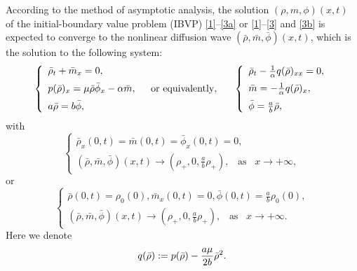 \documentclass[11pt]{article}
\theoremstyle{plain}
\numberwithin{equation}{section}
\begin{document}
According to the method of asymptotic analysis, the solution $\left(\rho,m,\phi\right)(x,t)$ of the initial-boundary value problem (IBVP) \eqref{1}--\eqref{3a} or \eqref{1}--\eqref{3} and \eqref{3b} is expected to converge to the nonlinear diffusion wave $\left(\bar\rho,\bar m,\bar\phi\right)(x,t)$, which is the solution to the following system:
	\begin{equation}\label{6}
		\left\{
		\begin{array}{lr}
			\bar\rho_t+\bar m_x=0,      \\[2mm]
			p(\bar\rho)_x=\mu\bar\rho\bar\phi_x-\alpha\bar m, \\[2mm]
			a\bar\rho=b\bar\phi,\\
		\end{array}
		\right.\;\;\;{\rm or \ equivalently,}\;\;\;\;\;\;
		\left\{
		\begin{array}{lr}
			\bar\rho_t-\frac{1}{\alpha}q(\bar\rho)_{xx}=0,     \\[2mm]
			\bar m=-\frac{1}{\alpha}q(\bar\rho)_x, \\[2mm]
			\bar\phi=\frac{a}{b}\bar\rho, \\
		\end{array}
		\right.
	\end{equation}
	with 
	\begin{equation}\label{7}
	\left\{
		\begin{array}{lr}
		\bar\rho_x(0,t)=\bar m(0,t)=\bar\phi_x(0,t)=0,\\[2mm]
		(\bar\rho,\bar m,\bar\phi)(x,t)\to\left(\rho_{+},0,\frac{a}{b}\rho_{+}\right),\;\;\;\mbox{as}\;\;\;x\to+\infty,
		\end{array}
		\right.
	\end{equation}
	or 
	\begin{equation}\label{8}
		\left\{
		\begin{array}{lr}
		\bar{\rho}(0,t)=\rho_0(0), \bar{m}_{x}(0,t)=0,\bar\phi(0,t)=\frac{a}{b}\rho_0(0),\\[2mm]
		(\bar\rho,\bar m,\bar\phi)(x,t)\to\left(\rho_{+},0,\frac{a}{b}\rho_{+}\right),\;\;\;\mbox{as}\;\;\;x\to+\infty.
		\end{array}
		\right.
	\end{equation}
	Here we denote
	\begin{equation}\notag
		q(\bar\rho):=p(\bar\rho)-\frac{a\mu}{2b}\bar\rho^2.
	\end{equation}
\end{document}
